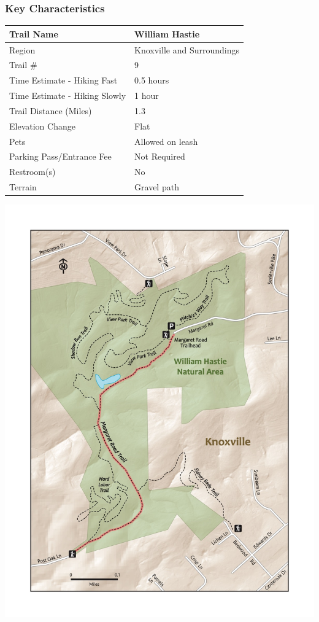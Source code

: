 \documentclass[
  letterpaper,
  DIV=11,
  numbers=noendperiod]{scrartcl}
\begin{document}
\hypertarget{key-characteristics-8}{%
\subsubsection{Key Characteristics}\label{key-characteristics-8}}

\begin{longtable}[]{@{}ll@{}}
\toprule\noalign{}
Trail Name & William Hastie \\
\midrule\noalign{}
\endhead
\bottomrule\noalign{}
\endlastfoot
Region & Knoxville and Surroundings \\
Trail \# & 9 \\
Time Estimate - Hiking Fast & 0.5 hours \\
Time Estimate - Hiking Slowly & 1 hour \\
Trail Distance (Miles) & 1.3 \\
Elevation Change & Flat \\
Pets & Allowed on leash \\
Parking Pass/Entrance Fee & Not Required \\
Restroom(s) & No \\
Terrain & Gravel path \\
\end{longtable}

\includegraphics{maps/trail-09-map.jpeg}
\end{document}

